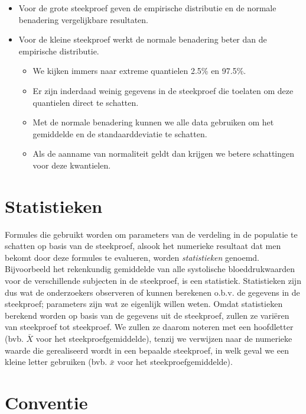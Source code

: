 \documentclass[
  12pt,dutch,coursenotes]{book}
\providecommand{\tightlist}{%
  \setlength{\itemsep}{0pt}\setlength{\parskip}{0pt}}
\theoremstyle{definition}
\theoremstyle{definition}
\theoremstyle{definition}
\theoremstyle{remark}
\begin{document}
\begin{itemize}
\item
  Voor de grote steekproef geven de empirische distributie en de normale benadering vergelijkbare resultaten.
\item
  Voor de kleine steekproef werkt de normale benadering beter dan de empirische distributie.

  \begin{itemize}
  \tightlist
  \item
    We kijken immers naar extreme quantielen 2.5\% en 97.5\%.
  \item
    Er zijn inderdaad weinig gegevens in de steekproef die toelaten om deze quantielen direct te schatten.
  \item
    Met de normale benadering kunnen we alle data gebruiken om het gemiddelde en de standaarddeviatie te schatten.
  \item
    Als de aanname van normaliteit geldt dan krijgen we betere schattingen voor deze kwantielen.
  \end{itemize}
\end{itemize}

\hypertarget{statistieken}{%
\section{Statistieken}\label{statistieken}}

Formules die gebruikt worden om parameters van de verdeling in de populatie te schatten op basis van de
steekproef, alsook het numerieke resultaat dat men bekomt door deze formules
te evalueren, worden \emph{statistieken} genoemd.
Bijvoorbeeld het
rekenkundig gemiddelde van alle systolische bloeddrukwaarden voor de verschillende subjecten
in de steekproef, is een statistiek. Statistieken zijn dus wat
de onderzoekers observeren of kunnen berekenen o.b.v. de gegevens in de
steekproef; parameters zijn wat ze eigenlijk willen weten.
Omdat statistieken berekend worden op basis van de gegevens uit de steekproef, zullen ze variëren van steekproef tot steekproef.
We zullen ze daarom noteren met een hoofdletter (bvb. \(\bar X\) voor het steekproefgemiddelde), tenzij we verwijzen naar de numerieke waarde die gerealiseerd wordt in een bepaalde steekproef, in welk geval we een kleine letter gebruiken (bvb. \(\bar x\) voor het steekproefgemiddelde).

\hypertarget{conventie}{%
\section{Conventie}\label{conventie}}
\end{document}
